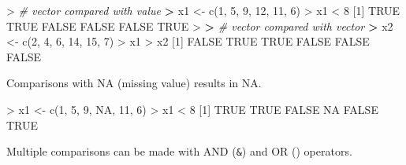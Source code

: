 \documentclass[
]{book}
\newenvironment{Shaded}{\begin{snugshade}}{\end{snugshade}}
\newcommand{\CommentTok}[1]{\textcolor[rgb]{0.56,0.35,0.01}{\textit{#1}}}
\newcommand{\ConstantTok}[1]{\textcolor[rgb]{0.00,0.00,0.00}{#1}}
\newcommand{\DecValTok}[1]{\textcolor[rgb]{0.00,0.00,0.81}{#1}}
\newcommand{\ErrorTok}[1]{\textcolor[rgb]{0.64,0.00,0.00}{\textbf{#1}}}
\newcommand{\FunctionTok}[1]{\textcolor[rgb]{0.00,0.00,0.00}{#1}}
\newcommand{\NormalTok}[1]{#1}
\newcommand{\OtherTok}[1]{\textcolor[rgb]{0.56,0.35,0.01}{#1}}
\newcommand{\SpecialCharTok}[1]{\textcolor[rgb]{0.00,0.00,0.00}{#1}}
\begin{document}
\begin{Shaded}
\begin{Highlighting}[]
\SpecialCharTok{\textgreater{}} \CommentTok{\# vector compared with value}
\ErrorTok{\textgreater{}}\NormalTok{ x1 }\OtherTok{\textless{}{-}} \FunctionTok{c}\NormalTok{(}\DecValTok{1}\NormalTok{, }\DecValTok{5}\NormalTok{, }\DecValTok{9}\NormalTok{, }\DecValTok{12}\NormalTok{, }\DecValTok{11}\NormalTok{, }\DecValTok{6}\NormalTok{)}
\SpecialCharTok{\textgreater{}}\NormalTok{ x1 }\SpecialCharTok{\textless{}} \DecValTok{8}
\NormalTok{[}\DecValTok{1}\NormalTok{]  }\ConstantTok{TRUE}  \ConstantTok{TRUE} \ConstantTok{FALSE} \ConstantTok{FALSE} \ConstantTok{FALSE}  \ConstantTok{TRUE}
\SpecialCharTok{\textgreater{}} 
\ErrorTok{\textgreater{}} \CommentTok{\# vector compared with vector}
\ErrorTok{\textgreater{}}\NormalTok{ x2 }\OtherTok{\textless{}{-}} \FunctionTok{c}\NormalTok{(}\DecValTok{2}\NormalTok{, }\DecValTok{4}\NormalTok{, }\DecValTok{6}\NormalTok{, }\DecValTok{14}\NormalTok{, }\DecValTok{15}\NormalTok{, }\DecValTok{7}\NormalTok{)}
\SpecialCharTok{\textgreater{}}\NormalTok{ x1 }\SpecialCharTok{\textgreater{}}\NormalTok{ x2}
\NormalTok{[}\DecValTok{1}\NormalTok{] }\ConstantTok{FALSE}  \ConstantTok{TRUE}  \ConstantTok{TRUE} \ConstantTok{FALSE} \ConstantTok{FALSE} \ConstantTok{FALSE}
\end{Highlighting}
\end{Shaded}

Comparisons with NA (missing value) results in NA.

\begin{Shaded}
\begin{Highlighting}[]
\SpecialCharTok{\textgreater{}}\NormalTok{ x1 }\OtherTok{\textless{}{-}} \FunctionTok{c}\NormalTok{(}\DecValTok{1}\NormalTok{, }\DecValTok{5}\NormalTok{, }\DecValTok{9}\NormalTok{, }\ConstantTok{NA}\NormalTok{, }\DecValTok{11}\NormalTok{, }\DecValTok{6}\NormalTok{)}
\SpecialCharTok{\textgreater{}}\NormalTok{ x1 }\SpecialCharTok{\textless{}} \DecValTok{8}
\NormalTok{[}\DecValTok{1}\NormalTok{]  }\ConstantTok{TRUE}  \ConstantTok{TRUE} \ConstantTok{FALSE}    \ConstantTok{NA} \ConstantTok{FALSE}  \ConstantTok{TRUE}
\end{Highlighting}
\end{Shaded}

Multiple comparisons can be made with AND (\texttt{\&}) and OR (\texttt{\textbar{}}) operators.
\end{document}
